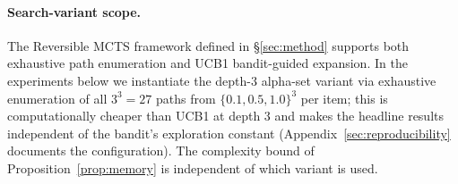 \documentclass{article}
\begin{document}
\paragraph{Search-variant scope.} The Reversible MCTS framework defined in §\ref{sec:method} supports both exhaustive path enumeration and UCB1 bandit-guided expansion. In the experiments below we instantiate the depth-$3$ alpha-set variant via exhaustive enumeration of all $3^3 = 27$ paths from $\{0.1, 0.5, 1.0\}^3$ per item; this is computationally cheaper than UCB1 at depth $3$ and makes the headline results independent of the bandit's exploration constant (Appendix~\ref{sec:reproducibility} documents the configuration). The complexity bound of Proposition~\ref{prop:memory} is independent of which variant is used.

\end{document}
